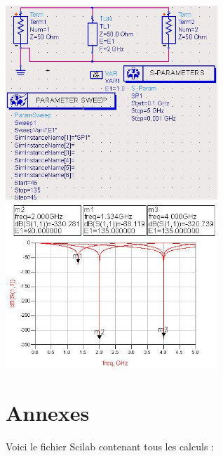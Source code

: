 \documentclass[10pt]{article}
\begin{document}
  \includegraphics[width=8cm]{I3_c_circ.jpg}
  \includegraphics[width=8cm]{I3_c_simu.jpg}

 \section{Annexes}
  Voici le fichier Scilab contenant tous les calculs :
  \inputminted[linenos]{matlab}{calculs.sci}
\end{document}
